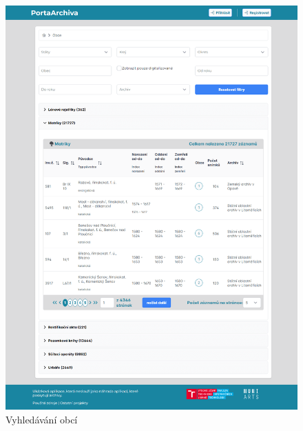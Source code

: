 \begin{figure}[htbp]
\centering
    \includegraphics[scale=.3]{obrazky-figures/implementation/productScreenshots/obce.png}
    \caption{Vyhledávání obcí}
\end{figure}